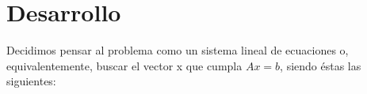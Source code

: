\section{Desarrollo}

Decidimos pensar al problema como un sistema lineal de ecuaciones o, 
equivalentemente, buscar el vector x que cumpla $Ax=b$, siendo éstas las siguientes:
